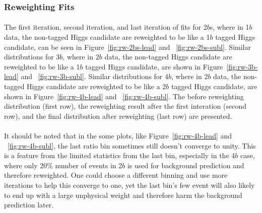 \subsubsection{Reweighting Fits}
\label{sec:boosted-Reweight-Fit}
\paragraph{}
The first iteration, second iteration, and last iteration of fits for 2$b$s, where in 1$b$ data, the non-tagged Higgs candidate are reweighted to be like a 1$b$ tagged Higgs candidate, can be seen in Figure~\ref{fig:rw-2bs-lead} and ~\ref{fig:rw-2bs-subl}. Similar distributions for 3$b$, where in 2$b$ data, the non-tagged Higgs candidate are reweighted to be like a 1$b$ tagged Higgs candidate, are shown in Figure~\ref{fig:rw-3b-lead} and ~\ref{fig:rw-3b-subl}. Similar distributions for 4$b$, where in 2$b$ data, the non-tagged Higgs candidate are reweighted to be like a 2$b$ tagged Higgs candidate, are shown in Figure~\ref{fig:rw-4b-lead} and ~\ref{fig:rw-4b-subl}. The before reweighting distribution (first row), the reweighting result after the first interation (second row), and the final distribution after reweighting (last row) are presented.

\paragraph{}
It should be noted that in the some plots, like Figure~\ref{fig:rw-4b-lead} and ~\ref{fig:rw-4b-subl}, the last ratio bin sometimes still doesn't converge to unity. This is a feature from the limited statistics from the last bin, especially in the 4$b$ case, where only $20\%$ number of events in 2$b$ is used for background prediction and therefore reweighted. One could choose a different binning and use more iterations to help this converge to one, yet the last bin's few event will also likely to end up with a large unphysical weight and therefore harm the background prediction later.


